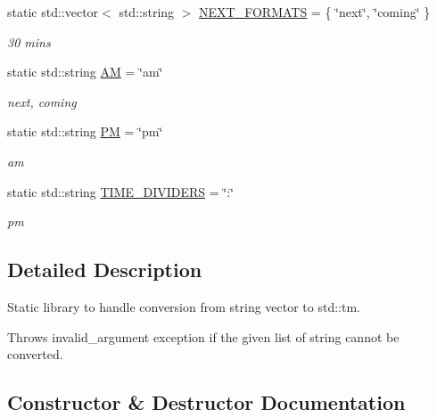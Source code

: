\begin{DoxyCompactItemize}
static std\+::vector$<$ std\+::string $>$ \hyperlink{class_do_lah_1_1_date_time_parser_a4bfc49a590f5662df8ffe2f8a6778997}{N\+E\+X\+T\+\_\+\+F\+O\+R\+M\+A\+T\+S} = \{ \char`\"{}next\char`\"{}, \char`\"{}coming\char`\"{} \}
\begin{DoxyCompactList}\small\item\em 30 mins \end{DoxyCompactList}\item 
static std\+::string \hyperlink{class_do_lah_1_1_date_time_parser_a2e5d86b7140cd250657ac37ac8b37278}{A\+M} = \char`\"{}am\char`\"{}
\begin{DoxyCompactList}\small\item\em next, coming \end{DoxyCompactList}\item 
static std\+::string \hyperlink{class_do_lah_1_1_date_time_parser_a3c3173f1f18e2353e2f2dda0d075fb86}{P\+M} = \char`\"{}pm\char`\"{}
\begin{DoxyCompactList}\small\item\em am \end{DoxyCompactList}\item 
static std\+::string \hyperlink{class_do_lah_1_1_date_time_parser_a12154c3dbe0bc222f7a2f20e0b9ee21c}{T\+I\+M\+E\+\_\+\+D\+I\+V\+I\+D\+E\+R\+S} = \char`\"{}\+:\char`\"{}
\begin{DoxyCompactList}\small\item\em pm \end{DoxyCompactList}\end{DoxyCompactItemize}


\subsection{Detailed Description}
Static library to handle conversion from string vector to std\+::tm. 

Throws invalid\+\_\+argument exception if the given list of string cannot be converted. 

\subsection{Constructor \& Destructor Documentation}
\hypertarget{class_do_lah_1_1_date_time_parser_afbde4ac9bc1256361277129d68001b00}{}
